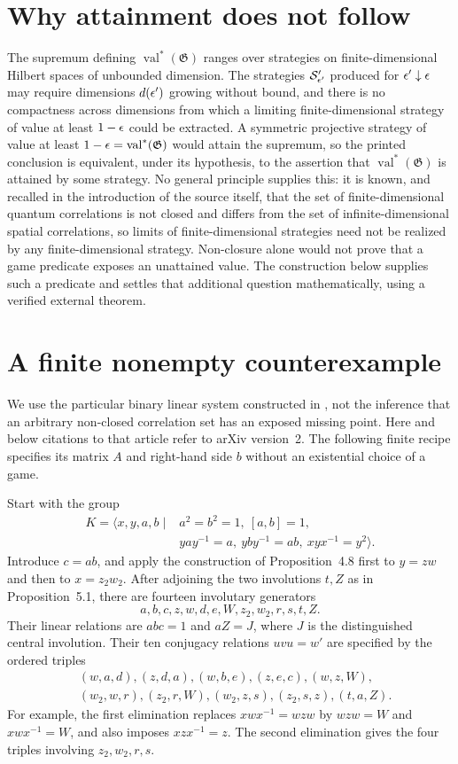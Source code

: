 \documentclass[11pt]{article}
\newcommand{\val}{\operatorname{val}}
\newcommand{\game}{\mathfrak{G}}
\newcommand{\strategy}{\mathcal{S}}
\begin{document}
\section{Why attainment does not follow}

The supremum defining $\val^*(\game)$ ranges over strategies on
finite-dimensional Hilbert spaces of unbounded dimension.  The strategies
$\strategy'_{\eps'}$ produced for $\epsilon' \downarrow \epsilon$ may require
dimensions $d(\epsilon')$ growing without bound, and there is no compactness
across dimensions from which a limiting finite-dimensional strategy of value
at least $1-\epsilon$ could be extracted.  A symmetric projective strategy of
value at least $1-\eps = \val^*(\game)$ would attain the supremum, so the
printed conclusion is equivalent, under its hypothesis, to the assertion that
$\val^*(\game)$ is attained by some strategy.  No general principle supplies
this: it is known, and recalled in the introduction of the source itself, that
the set of finite-dimensional quantum correlations is not closed and differs
from the set of infinite-dimensional spatial correlations, so limits of
finite-dimensional strategies need not be realized by any finite-dimensional
strategy. Non-closure alone would not prove that a game predicate exposes an
unattained value. The construction below supplies such a predicate and settles
that additional question mathematically, using a verified external theorem.

\section{A finite nonempty counterexample}

We use the particular binary linear system constructed in
\cite[Proposition~5.1]{Slofstra2017Nonclosure}, not the inference that an
arbitrary non-closed correlation set has an exposed missing point. Here and
below citations to that article refer to arXiv version~2. The following
finite recipe specifies its matrix $A$ and right-hand side $b$ without an
existential choice of a game.

Start with the group
\[
\begin{split}
 K=\langle x,y,a,b\mid &a^2=b^2=1,\ [a,b]=1,\\
 &yay^{-1}=a,\ yby^{-1}=ab,\ xyx^{-1}=y^2\rangle.
\end{split}
\]
Introduce $c=ab$, and apply the construction of Proposition~4.8 first to
$y=zw$ and then to $x=z_2w_2$. After adjoining the two involutions $t,Z$
as in Proposition~5.1, there are fourteen involutary generators
\[
 a,b,c,z,w,d,e,W,z_2,w_2,r,s,t,Z.
\]
Their linear relations are $abc=1$ and $aZ=J$, where $J$ is the distinguished
central involution. Their ten conjugacy relations $uvu=w'$ are specified by
the ordered triples
\[
\begin{split}
 &(w,a,d),(z,d,a),(w,b,e),(z,e,c),(w,z,W),\\
 &(w_2,w,r),(z_2,r,W),(w_2,z,s),(z_2,s,z),(t,a,Z).
\end{split}
\]
For example, the first elimination replaces $xwx^{-1}=wzw$ by
$wzw=W$ and $xwx^{-1}=W$, and also imposes $xzx^{-1}=z$.
The second elimination gives the four triples involving $z_2,w_2,r,s$.
\end{document}
